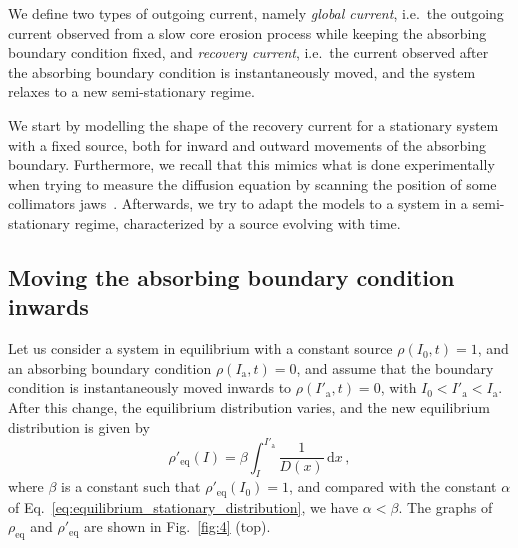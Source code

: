 {We define two types of outgoing current, namely \textsl{global current}, i.e.\ the outgoing current observed from a slow core erosion process while keeping the absorbing boundary condition fixed, and \textsl{recovery current}, i.e.\ the current observed after the absorbing boundary condition is instantaneously moved, and the system relaxes to a new semi-stationary regime.

We start by modelling the shape of the recovery current for a stationary system with a fixed source, both for inward and outward movements of the absorbing boundary. Furthermore, we recall that this mimics what is done experimentally when trying to measure the diffusion equation by scanning the position of some collimators jaws~{\cite{MESS1994279,flilleriii:pac03-rpag004,stancari2011diffusion,stancari:ipac11-tupz033,Stancari:1637929,PhysRevSTAB.16.021003,PhysRevAccelBeams.23.044802}}. Afterwards, we try to adapt the models to a system in a semi-stationary regime, characterized by a source evolving with time.


\subsection{Moving the absorbing boundary condition inwards}


Let us consider a system in equilibrium with a constant source $\rho(I_0, t)=1$, and an absorbing boundary condition $\rho(I_\mathrm{a}, t)=0$, and assume that the boundary condition is instantaneously moved inwards to $\rho(I'_\mathrm{a}, t)=0$, with $I_0 < I'_\mathrm{a} < I_\mathrm{a}$. After this change, the equilibrium distribution varies, and the new equilibrium distribution is given by
\begin{equation}
    \rho'_\text{eq}(I) = \beta \int_I^{I'_\mathrm{a}} \frac{1}{D(x)}\,\mathrm{d}x\,,
\end{equation}
where $\beta$ is a constant such that $\rho'_\text{eq}(I_0)=1$, and compared with the constant $\alpha$ of Eq.~\eqref{eq:equilibrium_stationary_distribution}, we have $\alpha < \beta$. The graphs of $\rho_\mathrm{eq}$ and $\rho'_\mathrm{eq}$ are shown in Fig.~\ref{fig:4} (top).

}

